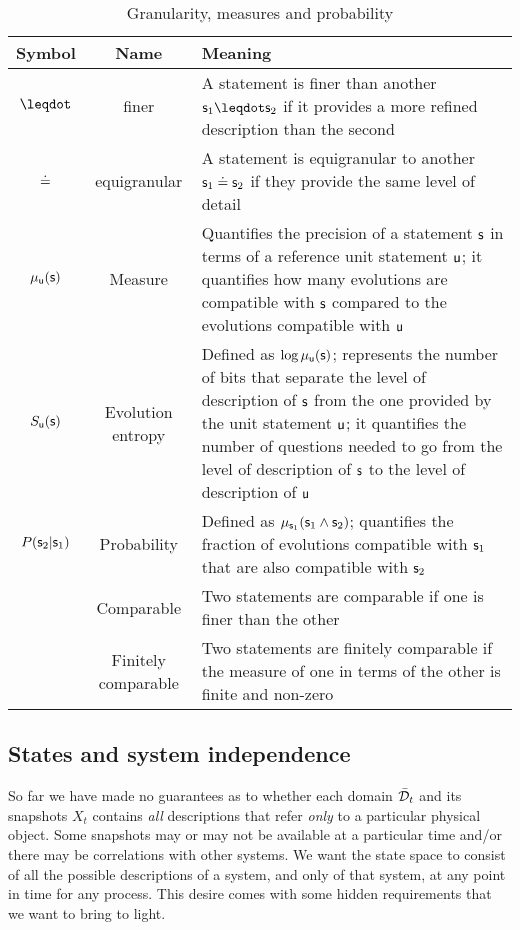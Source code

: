 \documentclass[letterpaper]{article}
\begin{document}
\begin{table}[h!]
	\centering
	\begin{tabular}[h]{|c|c|p{6cm}|}
		\hline 
		Symbol & Name & Meaning \\ 
		\hline 
		$\finer$ & finer & A statement is finer than another $\stmt_1 \finer \stmt_2$ if it provides a more refined description than the second \\ 
		\hline 
		$\eqgran$ & equigranular & A statement is equigranular to another $\stmt_1 \eqgran \stmt_2$ if they provide the same level of detail \\ 
		\hline 
		$\mu_{\stmt[u]}(\stmt)$ & Measure & Quantifies the precision of a statement $\stmt$ in terms of a reference unit statement $\stmt[u]$; it quantifies how many evolutions are compatible with $\stmt$ compared to the evolutions compatible with $\stmt[u]$  \\ 
		\hline 
		$S_{\stmt[u]}(\stmt)$ & Evolution entropy & Defined as $\log \mu_{\stmt[u]}(\stmt)$; represents the number of bits that separate the level of description of $\stmt$ from the one provided by the unit statement $\stmt[u]$; it quantifies the number of questions needed to go from the level of description of $\stmt$ to the level of description of $\stmt[u]$  \\ 
		\hline 
		$P(\stmt_2 | \stmt_1)$ & Probability & Defined as $\mu_{\stmt_1}(\stmt_1 \AND \stmt_2)$; quantifies the fraction of evolutions compatible with $\stmt_1$ that are also compatible with $\stmt_2$  \\ 
		\hline 
		 & Comparable & Two statements are comparable if one is finer than the other \\ 
		\hline 
		 & Finitely comparable & Two statements are finitely comparable if the measure of one in terms of the other is finite and non-zero \\ 
		\hline 
	\end{tabular} 
	\caption{Granularity, measures and probability}
	\label{table:states}
\end{table}

\subsection{States and system independence}

So far we have made no guarantees as to whether each domain $\tdomain_t$ and its snapshots $X_t$ contains \emph{all} descriptions that refer \emph{only} to a particular physical object. Some snapshots may or may not be available at a particular time and/or there may be correlations with other systems. We want the state space to consist of all the possible descriptions of a system, and only of that system, at any point in time for any process. This desire comes with some hidden requirements that we want to bring to light.
\end{document}
